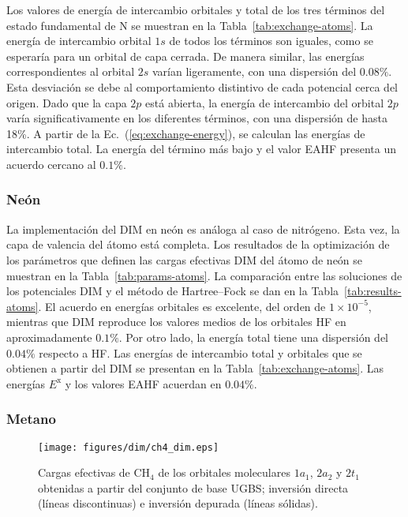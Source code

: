 Los valores de energía de intercambio orbitales y total de los tres 
términos del estado fundamental de N se muestran en la 
Tabla~\ref{tab:exchange-atoms}. La energía de intercambio orbital $1s$ 
de todos los términos son iguales, como se esperaría para un orbital de 
capa cerrada. De manera similar, las energías correspondientes al 
orbital $2s$ varían ligeramente, con una dispersión del $0.08\%$. Esta 
desviación se debe al comportamiento distintivo de cada potencial cerca 
del origen. Dado que la capa $2p$ está abierta, la energía de 
intercambio del orbital $2p$ varía significativamente en los diferentes 
términos, con una dispersión de hasta 18\%. 
A partir de la Ec.~(\ref{eq:exchange-energy}), se calculan las energías 
de intercambio total. La energía del término más bajo y el valor EAHF 
presenta un acuerdo cercano al $0.1\%$.

\subsubsection{Neón}

La implementación del DIM en neón es análoga al caso de nitrógeno. Esta
vez, la capa de valencia del átomo está completa. Los resultados de la 
optimización de los parámetros que definen las cargas efectivas DIM del 
átomo de neón se muestran en la Tabla~\ref{tab:params-atoms}. La 
comparación entre las soluciones de los potenciales DIM y el método de 
Hartree--Fock se dan en la Tabla~\ref{tab:results-atoms}. El acuerdo en 
energías orbitales es excelente, del orden de $1\times 10^{-5}$, 
mientras que DIM reproduce los valores medios de los orbitales HF en 
aproximadamente $0.1\%$. Por otro lado, la energía total tiene una 
dispersión del $0.04\%$ respecto a HF. Las energías de intercambio total 
y orbitales que se obtienen a partir del DIM se presentan en la 
Tabla~\ref{tab:exchange-atoms}. Las energías $E^{\mathrm{x}}$ y los 
valores EAHF acuerdan en $0.04\%$.

\subsubsection{Metano}

\begin{figure}[t]
\centering
\texttt{[image: figures/dim/ch4\_dim.eps]}
\caption[Cargas invertidas y depuradas de metano.]
{Cargas efectivas de CH$_4$ de los orbitales moleculares $1a_1$, $2a_2$ 
y $2t_1$ obtenidas a partir del conjunto de base UGBS; inversión directa 
(líneas discontinuas) e inversión depurada (líneas sólidas).}
\label{fig:ch4zeff}
\end{figure}

